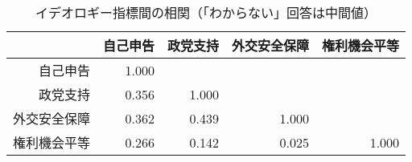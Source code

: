 \begin{table}[ht]
\centering
\caption{イデオロギー指標間の相関（「わからない」回答は中間値）} 
\begin{tabular}{rrrrr}
  \hline
 & 自己申告 & 政党支持 & 外交安全保障 & 権利機会平等 \\ 
  \hline
自己申告 & 1.000 &  &  &  \\ 
  政党支持 & 0.356 & 1.000 &  &  \\ 
  外交安全保障 & 0.362 & 0.439 & 1.000 &  \\ 
  権利機会平等 & 0.266 & 0.142 & 0.025 & 1.000 \\ 
   \hline
\end{tabular}
\end{table}
